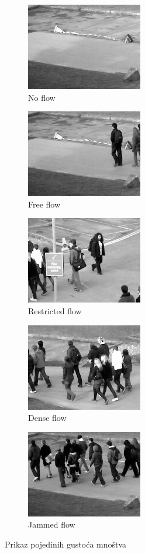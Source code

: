 \documentclass[times, utf8, zavrsni]{fer}
\begin{document}
\begin{figure}[ht]
	\begin{subfigure}[b]{0.19\linewidth}
		\centering
		\includegraphics[scale=0.5]{img/noflow.jpg}
		\caption{No flow}
	\end{subfigure}
	\begin{subfigure}[b]{0.19\linewidth}
		\centering
		\includegraphics[scale=0.5]{img/freeflow.jpg}
		\caption{Free flow}
	\end{subfigure}
	\begin{subfigure}[b]{0.19\linewidth}
		\centering
		\includegraphics[scale=0.5]{img/restrictedflow.jpg}
		\caption{Restricted flow}
	\end{subfigure}
	\begin{subfigure}[b]{0.19\linewidth}
		\centering
		\includegraphics[scale=0.5]{img/denseflow.jpg}
		\caption{Dense flow}
	\end{subfigure}
	\begin{subfigure}[b]{0.19\linewidth}
		\centering
		\includegraphics[scale=0.5]{img/jammedflow.jpg}
		\caption{Jammed flow}
	\end{subfigure}
\caption{Prikaz pojedinih gustoća mnoštva}
\end{figure}
\end{document}
